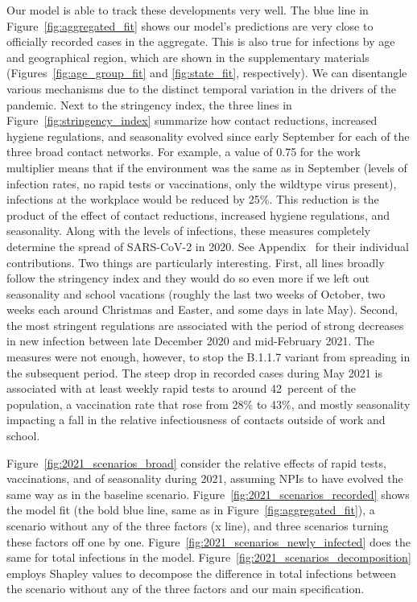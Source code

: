 Our model is able to track these developments very well. The blue line in
Figure~\ref{fig:aggregated_fit} shows our model's predictions are very close to
officially recorded cases in the aggregate. This is also true for infections by age and
geographical region, which are shown in the supplementary materials
(Figures~\ref{fig:age_group_fit} and \ref{fig:state_fit}, respectively). We can
disentangle various mechanisms due to the distinct temporal variation in the drivers of
the pandemic. Next to the stringency index, the three lines in
Figure~\ref{fig:stringency_index} summarize how contact reductions, increased hygiene
regulations, and seasonality evolved since early September for each of the three broad
contact networks. For example, a value of 0.75 for the work multiplier means that if the
environment was the same as in September (levels of infection rates, no rapid tests or
vaccinations, only the wildtype virus present), infections at the workplace would be
reduced by 25\%. This reduction is the product of the effect of contact reductions,
increased hygiene regulations, and seasonality. Along with the levels of infections,
these measures completely determine the spread of SARS-CoV-2 in
2020. See Appendix~
for their individual contributions. Two things are particularly interesting. First, all
lines broadly follow the stringency index and they would do so even more if we left out
seasonality and school vacations (roughly the last two weeks of October, two weeks each
around Christmas and Easter, and some days in late May). Second, the most stringent
regulations are associated with the period of strong decreases in new infection between
late December 2020 and mid-February 2021. The measures were not enough, however, to stop
the B.1.1.7 variant from spreading in the subsequent period. The steep drop in recorded
cases during May 2021 is associated with at least weekly rapid tests to around
42~percent of the population, a vaccination rate that rose from 28\% to 43\%, and mostly
seasonality impacting a fall in the relative infectiousness of contacts outside of work
and school.

Figure~\ref{fig:2021_scenarios_broad} consider the relative effects of rapid tests,
vaccinations, and of seasonality during 2021, assuming NPIs to have evolved the same way
as in the baseline scenario. Figure~\ref{fig:2021_scenarios_recorded} shows the model
fit (the bold blue line, same as in
Figure~\ref{fig:aggregated_fit}), a scenario without any of the three factors (x line),
and three scenarios turning these factors off one by one.
Figure~\ref{fig:2021_scenarios_newly_infected} does the same for total infections in the
model. Figure~\ref{fig:2021_scenarios_decomposition} employs Shapley values to decompose
the difference in total infections between the scenario without any of the three factors
and our main specification.


